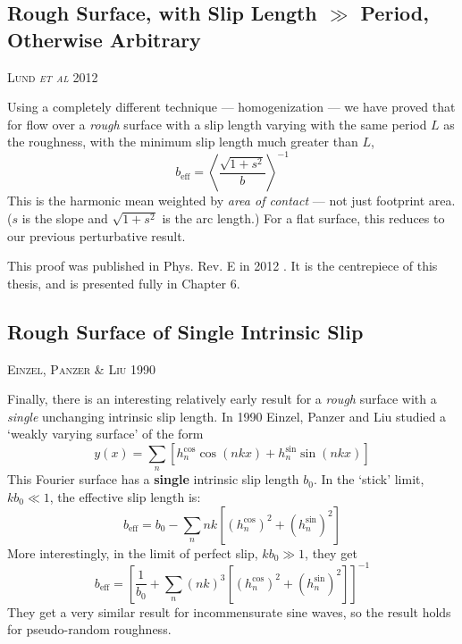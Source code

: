 \documentclass[12pt, a4paper, twoside, openright]{book}
\newcommand{\beff}{\ensuremath{b_{\mathrm{eff}}}}
\newcommand{\paper}[1]
         {\colorbox[gray]{0.8}{ \textsc{#1}}
         
         }
\begin{document}
\subsection*{Rough Surface, with Slip Length $\gg$ Period, Otherwise Arbitrary}

\paper{Lund \emph{et al} 2012}
Using a completely different technique --- homogenization --- we have proved that
for flow over a \emph{rough} surface with a slip length varying with the same period $L$ as the roughness, with the minimum slip length much greater than $L$,
\begin{equation}
\beff = \left< \frac{\sqrt{1 + s^2}}{b} \right>^{-1}
\end{equation}
This is the harmonic mean weighted by \emph{area of contact} --- not just footprint area.  ($s$ is the slope and $\sqrt{1+s^2}$ is the arc length.)  For a flat surface, this reduces to our previous perturbative result.

This proof was published in Phys. Rev. E in 2012 \cite{Lund2012}.  It is the centrepiece of this thesis, and is presented fully in Chapter 6.


\subsection*{Rough Surface of Single Intrinsic Slip}

\paper{Einzel, Panzer \& Liu 1990}
Finally, there is an interesting relatively early result for a \emph{rough} surface with a \emph{single} unchanging intrinsic slip length.  In 1990 Einzel, Panzer and Liu \cite{EinzelPanzerLiu1990} studied a `weakly varying surface' of the form
\begin{equation}
y(x) = \sum_n \left[ h_n^{\cos} \cos(nkx) + h_n^{\sin} \sin(nkx) \right]
\end{equation} 
This Fourier surface has a \textbf{single} intrinsic slip length $b_0$.  In the `stick' limit, $kb_0 \ll 1$, the effective slip length is:
\begin{equation}
\beff = b_0 - \sum_n nk \left[ (h_n^{\cos})^2 + (h_n^{\sin})^2  \right]
\end{equation}
More interestingly, in the limit of perfect slip, $kb_0 \gg 1$, they get
\begin{equation}
\beff = \left[ \frac{1}{b_0} + \sum_n (nk)^3 \left[ (h_n^{\cos})^2 + (h_n^{\sin})^2 \right]
 \right]^{-1}
\end{equation}
They get a very similar result for incommensurate sine waves, so the result holds for pseudo-random roughness.
\end{document}
